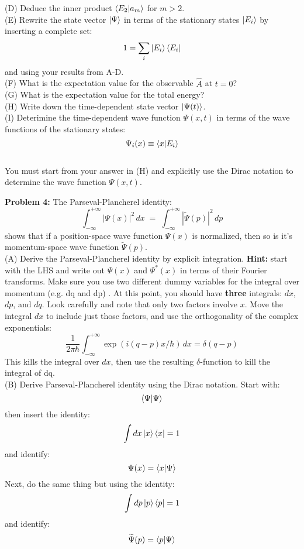 \documentclass[12pt]{article}
\begin{document}
\noindent
(D) Deduce the inner product $\braket{E_2|a_m}$ for $m>2$.\\[5pt]

\noindent
(E) Rewrite the state vector $\ket{\Psi}$ in terms of the stationary states $\ket{E_i}$ by inserting a complete set:
$$1 = \sum_i \ket{E_i}\bra{E_i}$$
and using your results from A-D.\\[5pt]

\noindent
(F) What is the expectation value for the observable $\hat{A}$ at $t=0$?\\[5pt]

\noindent
(G) What is the expectation value for the total energy?\\[5pt]

\noindent
(H) Write down the time-dependent state vector $\ket{\Psi(t)}$.\\[5pt]

\noindent
(I) Deterimine the time-dependent wave function $\Psi(x,t)$ in terms of the wave functions of the stationary states:
$$\Psi_{i}(x) \equiv \braket{x|E_i}$$\\[5pt]
You must start from your answer in (H) and explicitly use the Dirac notation to determine the wave function $\Psi(x,t)$.

\newpage

\noindent
{\bf Problem 4:} The Parseval-Plancherel identity:
$$\int_{-\infty}^{+\infty} |\Psi(x)|^2 \, dx \; = \; \int_{-\infty}^{+\infty} |\widetilde{\Psi}(p)|^2 \, dp$$
shows that if a position-space wave function $\Psi(x)$ is normalized, then so is it's momentum-space wave function $\widetilde{\Psi}(p)$.\\[5pt]

\noindent
(A) Derive the Parseval-Plancherel identity by explicit integration.  {\bf Hint:  } start with the LHS and write out $\Psi(x)$ and $\Psi^*(x)$ in terms of their Fourier transforms.  Make sure you use two different dummy variables for the integral over momentum (e.g. dq and dp) .  At this point, you should have {\bf three} integrals: $dx$,$dp$, and $dq$.  Look carefully and note that only two factors involve $x$.  Move the integral $dx$ to include just those factors, and use the orthogonality of the complex exponentials:
$$\frac{1}{2\pi\hbar}\int_{-\infty}^{+\infty} \exp(i(q-p)x/\hbar) \, dx = \delta(q-p)$$
This kills the integral over $dx$, then use the resulting $\delta$-function to kill the integral of dq.\\[5pt]

\noindent
(B) Derive Parseval-Plancherel identity using the Dirac notation.  Start with:
$$\braket{\Psi|\Psi}$$
then insert the identity:
$$\int dx \ket{x}\bra{x} = 1$$
and identify:
$$\Psi(x) = \braket{x|\Psi}$$
Next, do the same thing but using the identity:
$$\int dp \ket{p}\bra{p} = 1$$
and identify:
$$\widetilde{\Psi}(p) = \braket{p|\Psi}$$
\end{document}
